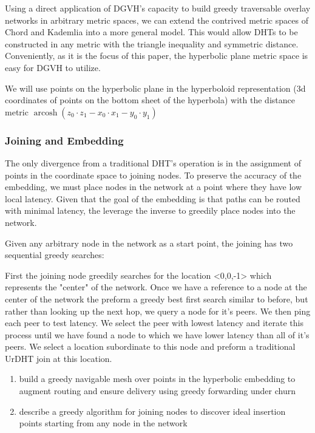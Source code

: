 
Using a direct application of DGVH's capacity to build greedy traversable overlay networks in arbitrary metric spaces, we can extend the contrived metric spaces of Chord and Kademlia into a more general model. This would allow DHTs to be constructed in any metric with the triangle inequality and symmetric distance. Conveniently, as it is the focus of this paper, the hyperbolic plane metric space is easy for DGVH to utilize.

We will use points on the hyperbolic plane in the hyperboloid representation\cite{jansen1909abbildung} (3d coordinates of points on the bottom sheet of the hyperbola) with the distance metric $\operatorname{arcosh} (z_{0} \cdot z_{1} - x_{0} \cdot x_{1} - y_{0} \cdot y_{1})$

\subsubsection{Joining and Embedding}

The only divergence from a traditional DHT's operation is in the assignment of points in the coordinate space to joining nodes.
To preserve the accuracy of the embedding, we must place nodes in the network at a point where they have low local latency.
Given that the goal of the embedding is that paths can be routed with minimal latency, the leverage the inverse to greedily place nodes into the network.

Given any arbitrary node in the network as a start point, the joining has two sequential greedy searches:

First the joining node greedily searches for the location <0,0,-1> which represents the "center" of the network.
Once we have a reference to a node at the center of the network the preform a greedy best first search similar to before, but rather than looking up the next hop, we query a node for it's peers. We then ping each peer to test latency. We select the peer with lowest latency and iterate this process until we have found a node to which we have lower latency than all of it's peers. We select a location subordinate to this node and preform a traditional UrDHT join at this location.


\begin{enumerate}
\item build a greedy navigable mesh over points in the hyperbolic embedding to augment routing and ensure delivery using greedy forwarding under churn
\item describe a greedy algorithm for joining nodes to discover ideal insertion points starting from any node in the network
\end{enumerate}

